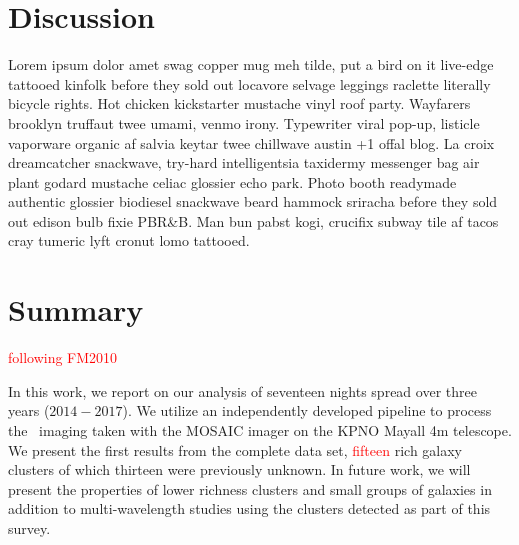 \documentclass[apj, revtex4-1]{emulateapj}
\newcommand{\editorial}[1]{\textcolor{red}{#1}}
\begin{document}
\section{Discussion}\label{sec:discussion}

Lorem ipsum dolor amet swag copper mug meh tilde, put a bird on it live-edge tattooed kinfolk before they sold out locavore selvage leggings raclette literally bicycle rights. Hot chicken kickstarter mustache vinyl roof party. Wayfarers brooklyn truffaut twee umami, venmo irony. Typewriter viral pop-up, listicle vaporware organic af salvia keytar twee chillwave austin +1 offal blog. La croix dreamcatcher snackwave, try-hard intelligentsia taxidermy messenger bag air plant godard mustache celiac glossier echo park. Photo booth readymade authentic glossier biodiesel snackwave beard hammock sriracha before they sold out edison bulb fixie PBR\&B. Man bun pabst kogi, crucifix subway tile af tacos cray tumeric lyft cronut lomo tattooed.

\section{Summary}\label{sec:summary}

\editorial{following FM2010}

In this work, we report on our analysis of seventeen nights spread over three years ($2014-2017$). We utilize an independently developed pipeline to process the \sdssg\sdssr\sdssi\sdssz\ imaging taken with the MOSAIC imager on the KPNO Mayall 4m telescope. We present the first results from the complete data set, \editorial{fifteen} rich galaxy clusters of which thirteen were previously unknown. In future work, we will present the properties of lower richness clusters and small groups of galaxies in addition to multi-wavelength studies using the clusters detected as part of this survey.
\end{document}
